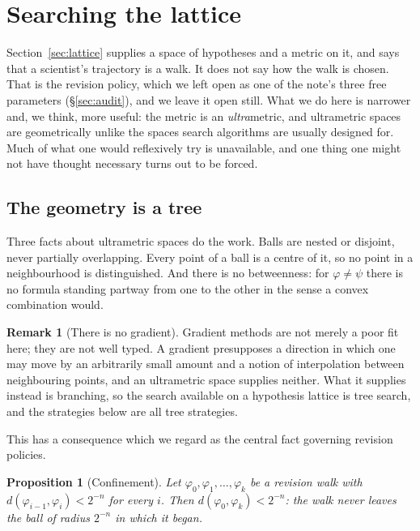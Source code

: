 \documentclass[11pt]{article}
\theoremstyle{plain}
\newtheorem{proposition}[theorem]{Proposition}
\theoremstyle{definition}
\newtheorem{remark}[theorem]{Remark}
\begin{document}
\section{Searching the lattice}
\label{sec:search}

Section~\ref{sec:lattice} supplies a space of hypotheses and a metric on it, and says that a scientist's
trajectory is a walk. It does not say how the walk is chosen. That is the revision policy, which we
left open as one of the note's three free parameters (\S\ref{sec:audit}), and we leave it open still.
What we do here is narrower and, we think, more useful: the metric is an \emph{ultra}metric, and
ultrametric spaces are geometrically unlike the spaces search algorithms are usually designed for. Much
of what one would reflexively try is unavailable, and one thing one might not have thought necessary
turns out to be forced.

\subsection{The geometry is a tree}

Three facts about ultrametric spaces do the work. Balls are nested or disjoint, never partially
overlapping. Every point of a ball is a centre of it, so no point in a neighbourhood is distinguished.
And there is no betweenness: for $\varphi \ne \psi$ there is no formula standing partway from one to
the other in the sense a convex combination would.

\begin{remark}[There is no gradient]
\label{rem:nogradient}
Gradient methods are not merely a poor fit here; they are not well typed. A gradient presupposes a
direction in which one may move by an arbitrarily small amount and a notion of interpolation between
neighbouring points, and an ultrametric space supplies neither. What it supplies instead is branching,
so the search available on a hypothesis lattice is tree search, and the strategies below are all tree
strategies.
\end{remark}

This has a consequence which we regard as the central fact governing revision policies.

\begin{proposition}[Confinement]
\label{prop:confinement}
Let $\varphi_0, \varphi_1, \ldots, \varphi_k$ be a revision walk with
$d(\varphi_{i-1}, \varphi_i) < 2^{-n}$ for every $i$. Then $d(\varphi_0, \varphi_k) < 2^{-n}$: the
walk never leaves the ball of radius $2^{-n}$ in which it began.
\end{proposition}
\end{document}
